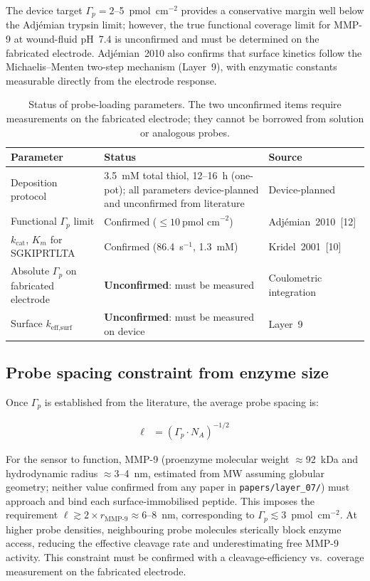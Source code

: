\documentclass[10pt,a4paper]{article}
\numberwithin{equation}{section}
\newcommand{\cit}[1]{[#1]}   %
\begin{document}
The device target $\Gamma_p = 2$--5~pmol~cm$^{-2}$ provides a conservative margin well
below the Adj\'{e}mian trypsin limit; however, the true functional coverage limit for
MMP-9 at wound-fluid pH~7.4 is unconfirmed and must be determined on the fabricated
electrode. Adj\'{e}mian~2010 also confirms that surface kinetics follow the
Michaelis--Menten two-step mechanism (Layer~9), with enzymatic constants measurable
directly from the electrode response.

\begin{table}[H]
\centering
\small\renewcommand{\arraystretch}{1.3}
\begin{tabular}{@{}p{4.5cm}p{5.0cm}p{4.0cm}@{}}
\toprule
\textbf{Parameter} & \textbf{Status} & \textbf{Source} \\
\midrule
Deposition protocol & 3.5~mM total thiol, 12--16~h (one-pot); all parameters device-planned and unconfirmed from literature & Device-planned \\
Functional $\Gamma_p$ limit & Confirmed ($\leq 10\ \text{pmol~cm}^{-2}$) & Adj\'{e}mian~2010~\cit{12} \\
$k_{\text{cat}}$, $K_m$ for SGKIPRTLTA & Confirmed (86.4~s$^{-1}$, 1.3~mM) & Kridel~2001~\cit{10} \\
Absolute $\Gamma_p$ on fabricated electrode & \textbf{Unconfirmed}: must be measured & Coulometric integration \\
Surface $k_{\text{eff,surf}}$ & \textbf{Unconfirmed}: must be measured on device & Layer~9 \\
\bottomrule
\end{tabular}
\caption{Status of probe-loading parameters. The two unconfirmed items require measurements
  on the fabricated electrode; they cannot be borrowed from solution or analogous probes.}
\label{tab:params_status}
\end{table}

\subsection{Probe spacing constraint from enzyme size}

Once $\Gamma_p$ is established from the literature, the average probe spacing is:

\begin{align}
  \ell &= (\Gamma_p \cdot N_A)^{-1/2} \label{eq:spacing}
\end{align}

For the sensor to function, MMP-9 (proenzyme molecular weight $\approx$92~kDa and
hydrodynamic radius $\approx 3$--4~nm, estimated from MW assuming globular geometry;
neither value confirmed from any paper in \texttt{papers/layer\_07/}) must approach
and bind each surface-immobilised peptide. This
imposes the requirement $\ell \gtrsim 2 \times r_{\text{MMP-9}} \approx 6$--8~nm,
corresponding to $\Gamma_p \lesssim 3$~pmol~cm$^{-2}$. At higher probe densities,
neighbouring probe molecules sterically block enzyme access, reducing the effective
cleavage rate and underestimating free MMP-9 activity. This constraint must be confirmed
with a cleavage-efficiency vs.\ coverage measurement on the fabricated electrode.
\end{document}
